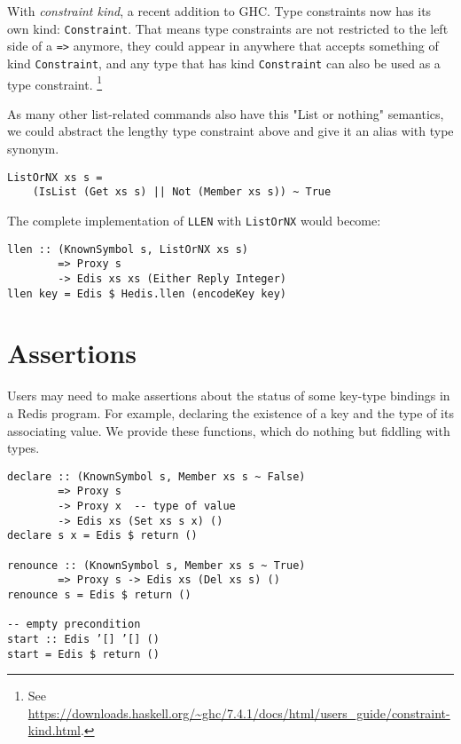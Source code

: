 \documentclass[pldi]{sigplanconf-pldi16}
\begin{document}
With \emph{constraint kind}, a recent addition to GHC. Type constraints now has
 its own kind: \texttt{Constraint}. That means type constraints
 are not restricted to the left side of a \texttt{=>} anymore,
 they could appear in anywhere that accepts something of kind
 \texttt{Constraint}, and any type that has kind
 \texttt{Constraint} can also be used as a type constraint.
 \footnote{See \url{https://downloads.haskell.org/~ghc/7.4.1/docs/html/users_guide/constraint-kind.html}.}

As many other list-related commands also have this "List or nothing" semantics,
 we could abstract the lengthy type constraint above and give it an alias with
 type synonym.

\begin{verbatim}
ListOrNX xs s =
    (IsList (Get xs s) || Not (Member xs s)) ~ True
\end{verbatim}

The complete implementation of \texttt{LLEN} with
\texttt{ListOrNX} would become:

\begin{verbatim}
llen :: (KnownSymbol s, ListOrNX xs s)
        => Proxy s
        -> Edis xs xs (Either Reply Integer)
llen key = Edis $ Hedis.llen (encodeKey key)
\end{verbatim}

\section{Assertions}

Users may need to make assertions about the status of some key-type bindings in
 a Redis program. For example, declaring the existence of a key and the type
 of its associating value. We provide these functions, which do nothing but
 fiddling with types.

\begin{verbatim}
declare :: (KnownSymbol s, Member xs s ~ False)
        => Proxy s
        -> Proxy x  -- type of value
        -> Edis xs (Set xs s x) ()
declare s x = Edis $ return ()

renounce :: (KnownSymbol s, Member xs s ~ True)
        => Proxy s -> Edis xs (Del xs s) ()
renounce s = Edis $ return ()

-- empty precondition
start :: Edis ’[] ’[] ()
start = Edis $ return ()
\end{verbatim}
\end{document}
